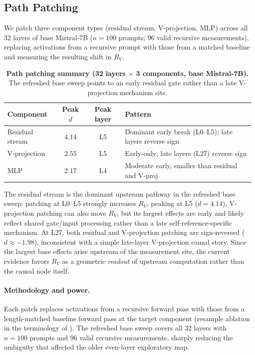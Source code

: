 \documentclass{article}
\newcommand{\RV}{R_V}
\newcommand{\dcohen}{d}
\begin{document}
\subsection{Path Patching}
\label{sec:pathpatch}

We patch three component types (residual stream, V-projection, MLP) across all
32 layers of base Mistral-7B ($n = 100$ prompts; 96 valid recursive measurements), replacing activations
from a recursive prompt with those from a matched baseline and measuring the resulting shift in $\RV$.

\begin{table}[ht]
\centering
\caption{\textbf{Path patching summary (32 layers $\times$ 3 components, base Mistral-7B).}
         The refreshed base sweep points to an early residual gate rather than a late V-projection mechanism site.}
\label{tab:pathpatch}
\smallskip
\begin{tabular}{lccp{5.5cm}}
\toprule
\textbf{Component} & \textbf{Peak $\dcohen$} & \textbf{Peak layer} & \textbf{Pattern} \\
\midrule
Residual stream & $4.14$ & L5 & Dominant early break (L0--L5); late layers reverse sign \\
V-projection    & $2.55$ & L5 & Early-only; late layers (L27) reverse sign \\
MLP             & $2.17$ & L4 & Moderate early, smaller than residual and V-proj \\
\bottomrule
\end{tabular}
\end{table}

The residual stream is the dominant upstream pathway in the refreshed base sweep:
patching at L0--L5 strongly increases $\RV$, peaking at L5 ($\dcohen = 4.14$).
V-projection patching can also move $\RV$, but its largest effects are early and likely reflect
shared gate/input processing rather than a late self-reference-specific mechanism.
At L27, both residual and V-projection patching are sign-reversed ($\dcohen \approx -1.98$),
inconsistent with a simple late-layer V-projection causal story.
Since the largest base effects arise upstream of the measurement site, the current evidence favors
$\RV$ as a geometric \emph{readout} of upstream computation rather than the causal node itself.

\paragraph{Methodology and power.}
Each patch replaces activations from a recursive forward pass with those from a
length-matched baseline forward pass at the target component (resample ablation in the
terminology of \citet{heimersheim2024activation}).
The refreshed base sweep covers all 32 layers with $n = 100$ prompts and 96 valid recursive
measurements, sharply reducing the ambiguity that affected the older even-layer exploratory map.
\end{document}

